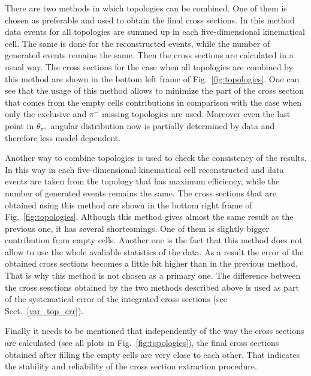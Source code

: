 There are two methods in which topologies can be combined. One of them is chosen as preferable and used to obtain the final cross sections. In this method data events for all topologies are summed up in each five-dimensional kinematical cell. The same is done for the reconstructed events, while the number of generated events remains the same. Then the cross sections are calculated in a usual way. The cross sections for the case when all topologies are combined by this method are shown in the bottom left frame of Fig.~\ref{fig:topologies}. One can see that the usage of this method allows to minimize the part of the cross section that comes from the empty cells contributions in comparison with the case when only the exclusive and $\pi^{-}$ missing topologies are used. Moreover even the last point in $\theta_{\pi^{+}}$  angular distribution now is partially determined by data and therefore less model dependent.

Another way to combine topologies is used to check the consistency of the results. In this way in each five-dimensional kinematical cell reconstructed and data events are taken from the topology that has maximum efficiency, while the number of generated events remains the same. The cross sections that are obtained using this method are shown in the bottom right frame of Fig.~\ref{fig:topologies}.  
Although this method gives almost the same result as the previous one, it has several shortcomings. One of them is slightly bigger contribution from empty cells. Another one is the fact that this method does not allow to use the whole avaliable statistics of the data. As a result the error of the obtained cross sections becomes a little bit higher than in the previous method. That is why this method is not chosen as a primary one.
The difference between the cross sesctions obtained by the two methods described above is used as part of the systematical error of the integrated cross sections (see Sect.~\ref{var_top_err}).


Finally it needs to be mentioned that independently of the way the cross sections are calculated (see all plots in Fig.~\ref{fig:topologies}), the final cross sections obtained after filling the empty cells are very close to each other. That indicates the stability and reliability of the cross section extraction procedure.




